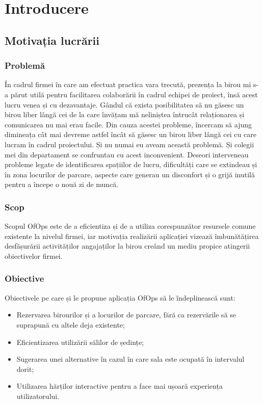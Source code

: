 \chapter{Introducere}

\section{Motivația lucrării}
\subsection{Problemă}
În cadrul firmei în care am efectuat practica vara trecută, prezența la birou mi s-a părut utilă pentru facilitarea colaborării în cadrul echipei de proiect, însă acest lucru venea și cu dezavantaje. Gândul că exista posibilitatea să nu găsesc un birou liber lângă cei de la care învățam mă neliniștea întrucât relaționarea și comunicarea nu mai erau facile. Din cauza acestei probleme, încercam să ajung dimineața cât mai devreme astfel încât să găsesc un birou liber lângă cei cu care lucram în cadrul proiectului. Și nu numai eu aveam această problemă. Și colegii mei din departament se confruntau cu acest inconvenient. Deseori interveneau probleme legate de identificarea spațiilor de lucru,  dificultăți care se extindeau și în zona locurilor de parcare, aspecte care generau un disconfort și o grijă inutilă pentru a începe o nouă zi de muncă.

\subsection{Scop}
Scopul OfOps este de a eficientiza și de a utiliza  corespunzător resursele comune existente la nivelul firmei, iar motivația realizării aplicației vizează îmbunătățirea desfășurării activităților angajaților la birou creând un mediu propice atingerii obiectivelor firmei.

\subsection{Obiective}
Obiectivele pe care și le propune aplicația OfOps să le îndeplinească sunt:
    \begin{itemize}[left=1.5cm]
         \item Rezervarea birourilor și a locurilor de parcare, fără ca rezervările să se suprapună cu altele deja existente;
        \item Eficientizarea utilizării sălilor de ședințe;
        \item Sugerarea unei alternative în cazul în care sala este ocupată în intervalul dorit;
        \item Utilizarea hărților interactive pentru a face mai ușoară experiența utilizatorului.
    \end{itemize}


